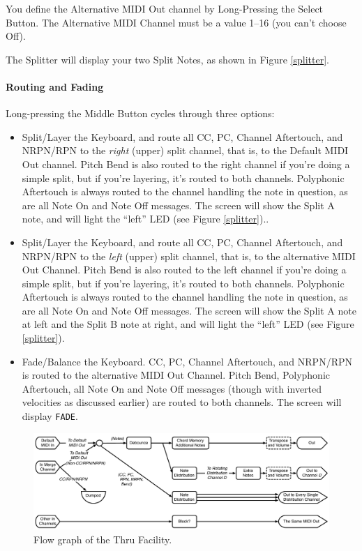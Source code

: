 \documentclass{article}
\begin{document}
You define the Alternative MIDI Out channel by Long-Pressing the Select Button.  The Alternative MIDI Channel must be a value 1--16 (you can't choose Off).

The Splitter will display your two Split Notes, as shown in Figure \ref{splitter}.

\paragraph{Routing and Fading}

Long-pressing the Middle Button cycles through three options:
\begin{itemize}
\item Split/Layer the Keyboard, and route all CC, PC, Channel Aftertouch, and NRPN/RPN to the {\it right} (upper) split channel, that is, to the Default MIDI Out channel.  Pitch Bend is also routed to the right channel if you're doing a simple split, but if you're layering, it's routed to both channels.  Polyphonic Aftertouch is always routed to the channel handling the note in question, as are all Note On and Note Off messages.  The screen will show the Split A note, and will light the ``left'' LED (see Figure \ref{splitter})..
\item Split/Layer the Keyboard, and route all CC, PC, Channel Aftertouch, and NRPN/RPN to the {\it left} (upper) split channel, that is, to the alternative MIDI Out Channel.  Pitch Bend is also routed to the left channel if you're doing a simple split, but if you're layering, it's routed to both channels.  Polyphonic Aftertouch is always routed to the channel handling the note in question, as are all Note On and Note Off messages.  The screen will show the Split A note at left and the Split B note at right, and will light the ``left'' LED (see Figure \ref{splitter}).
\item Fade/Balance the Keyboard.  CC, PC, Channel Aftertouch, and NRPN/RPN is routed to the alternative MIDI Out Channel.  Pitch Bend, Polyphonic Aftertouch, all Note On and Note Off messages (though with inverted velocities as discussed earlier) are routed to both channels.  The screen will display \texttt{FADE}.
\end{itemize}


\clearpage
\begin{figure}[h!]
\vspace{-1em}\includegraphics[width=6.5in]{thru.pdf}
\vspace{-1.25em}
\caption{Flow graph of the Thru Facility.}
\vspace{-0.5em}
\end{figure}
\end{document}
